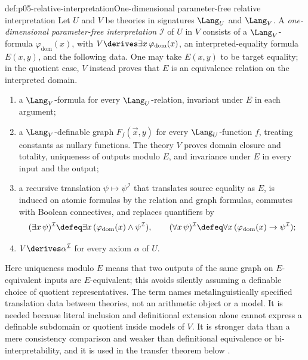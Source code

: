 \begin{hbdefinition}{def:p05-relative-interpretation}{One-dimensional parameter-free relative interpretation}
Let \(U\) and \(V\) be theories in signatures \(\Lang_U\) and
\(\Lang_V\).  A \emph{one-dimensional parameter-free interpretation}
\(\mathcal I\) of \(U\) in \(V\) consists of a \(\Lang_V\)-formula
\(\varphi_{\mathrm{dom}}(x)\), with
\(V\derives\exists x\,\varphi_{\mathrm{dom}}(x)\), an interpreted-equality
formula \(E(x,y)\), and the following data.  One may take \(E(x,y)\) to be
target equality; in the quotient case, \(V\) instead proves that \(E\) is
an equivalence relation on the interpreted domain.
\begin{enumerate}
  \item a \(\Lang_V\)-formula for every \(\Lang_U\)-relation, invariant
        under \(E\) in each argument;
  \item a \(\Lang_V\)-definable graph \(F_f(\vec x,y)\) for every
        \(\Lang_U\)-function \(f\), treating constants as nullary
        functions.  The theory \(V\) proves domain closure and totality,
        uniqueness of outputs modulo \(E\), and invariance under \(E\) in
        every input and the output;
  \item a recursive translation \(\psi\mapsto\psi^{\mathcal I}\) that
        translates source equality as \(E\), is induced on atomic formulas
        by the relation and graph formulas, commutes with Boolean
        connectives, and replaces quantifiers by
        \[
          (\exists x\,\psi)^{\mathcal I}\defeq
          \exists x\,(\varphi_{\mathrm{dom}}(x)\land\psi^{\mathcal I}),
          \qquad
          (\forall x\,\psi)^{\mathcal I}\defeq
          \forall x\,(\varphi_{\mathrm{dom}}(x)\to\psi^{\mathcal I});
        \]
  \item \(V\derives\alpha^{\mathcal I}\) for every axiom
        \(\alpha\) of \(U\).
\end{enumerate}
Here uniqueness modulo \(E\) means that two outputs of the same graph on
\(E\)-equivalent inputs are \(E\)-equivalent; this avoids silently assuming
a definable choice of quotient representatives.  The term names
metalinguistically specified translation data between theories, not an
arithmetic object or a model.  It is needed because literal inclusion and
definitional extension alone cannot express a definable subdomain or
quotient inside models of \(V\).  It is stronger data than a mere
consistency comparison and weaker than definitional equivalence or
bi-interpretability, and it is used in the transfer theorem below
\cite{TMR1953,Lindstrom2003}.
\end{hbdefinition}

